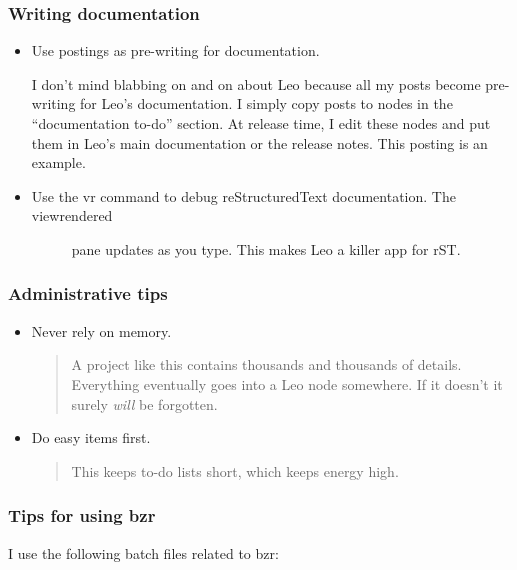 \documentclass[a4paper,10pt,english]{sphinxmanual}
\begin{document}
\subsubsection{Writing documentation}
\label{FAQ:writing-documentation}\begin{itemize}
\item {} 
Use postings as pre-writing for documentation.

I don't mind blabbing on and on about Leo because all my posts become
pre-writing for Leo's documentation. I simply copy posts to nodes in the
``documentation to-do'' section. At release time, I edit these nodes and put
them in Leo's main documentation or the release notes. This posting is an
example.

\item {} \begin{description}
\item[{Use the vr command to debug reStructuredText documentation. The viewrendered}] \leavevmode
pane updates as you type. This makes Leo a killer app for rST.

\end{description}

\end{itemize}


\subsubsection{Administrative tips}
\label{FAQ:administrative-tips}\begin{itemize}
\item {} 
Never rely on memory.
\begin{quote}

A project like this contains thousands and thousands of details. Everything
eventually goes into a Leo node somewhere. If it doesn't it surely \emph{will} be
forgotten.
\end{quote}

\item {} 
Do easy items first.
\begin{quote}

This keeps to-do lists short, which keeps energy high.
\end{quote}

\end{itemize}


\subsubsection{Tips for using bzr}
\label{FAQ:tips-for-using-bzr}
I use the following batch files related to bzr:
\end{document}

